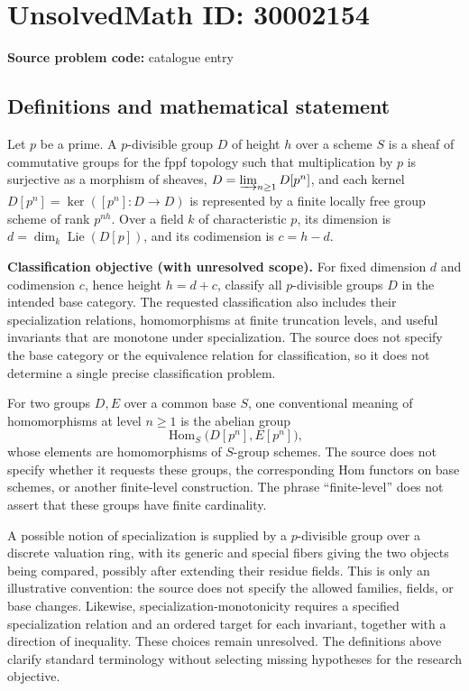 \documentclass[11pt]{article}
\begin{document}
\section*{UnsolvedMath ID: 30002154}
\textbf{Source problem code:} catalogue entry
\subsection{Definitions and mathematical statement}
Let \(p\) be a prime. A \(p\)-divisible group \(D\) of height \(h\) over a scheme \(S\) is a sheaf of commutative groups for the fppf topology such that multiplication by \(p\) is surjective as a morphism of sheaves, \(D=\varinjlim_{n\geq 1}D[p^n]\), and each kernel \(D[p^n]=\ker([p^n]\colon D\to D)\) is represented by a finite locally free group scheme of rank \(p^{nh}\). Over a field \(k\) of characteristic \(p\), its dimension is \(d=\dim_k\operatorname{Lie}(D[p])\), and its codimension is \(c=h-d\).

\textbf{Classification objective (with unresolved scope).} For fixed dimension \(d\) and codimension \(c\), hence height \(h=d+c\), classify all \(p\)-divisible groups \(D\) in the intended base category. The requested classification also includes their specialization relations, homomorphisms at finite truncation levels, and useful invariants that are monotone under specialization. The source does not specify the base category or the equivalence relation for classification, so it does not determine a single precise classification problem.

For two groups \(D,E\) over a common base \(S\), one conventional meaning of homomorphisms at level \(n\geq 1\) is the abelian group
\[
\operatorname{Hom}_S\bigl(D[p^n],E[p^n]\bigr),
\]
whose elements are homomorphisms of \(S\)-group schemes. The source does not specify whether it requests these groups, the corresponding Hom functors on base schemes, or another finite-level construction. The phrase ``finite-level'' does not assert that these groups have finite cardinality.

A possible notion of specialization is supplied by a \(p\)-divisible group over a discrete valuation ring, with its generic and special fibers giving the two objects being compared, possibly after extending their residue fields. This is only an illustrative convention: the source does not specify the allowed families, fields, or base changes. Likewise, specialization-monotonicity requires a specified specialization relation and an ordered target for each invariant, together with a direction of inequality. These choices remain unresolved. The definitions above clarify standard terminology without selecting missing hypotheses for the research objective.
\end{document}
